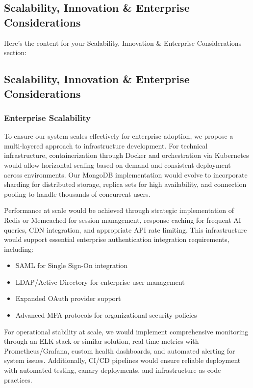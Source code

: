 \documentclass{article}
\begin{document}
\subsection{Scalability, Innovation \& Enterprise Considerations}

Here's the content for your Scalability, Innovation \& Enterprise Considerations section:

\subsection{Scalability, Innovation \& Enterprise Considerations}

\subsubsection{Enterprise Scalability}
To ensure our system scales effectively for enterprise adoption, we propose a multi-layered approach to infrastructure development. For technical infrastructure, containerization through Docker and orchestration via Kubernetes would allow horizontal scaling based on demand and consistent deployment across environments. Our MongoDB implementation would evolve to incorporate sharding for distributed storage, replica sets for high availability, and connection pooling to handle thousands of concurrent users.

Performance at scale would be achieved through strategic implementation of Redis or Memcached for session management, response caching for frequent AI queries, CDN integration, and appropriate API rate limiting. This infrastructure would support essential enterprise authentication integration requirements, including:

\begin{itemize}
    \item SAML for Single Sign-On integration
    \item LDAP/Active Directory for enterprise user management
    \item Expanded OAuth provider support
    \item Advanced MFA protocols for organizational security policies
\end{itemize}

For operational stability at scale, we would implement comprehensive monitoring through an ELK stack or similar solution, real-time metrics with Prometheus/Grafana, custom health dashboards, and automated alerting for system issues. Additionally, CI/CD pipelines would ensure reliable deployment with automated testing, canary deployments, and infrastructure-as-code practices.
\end{document}
